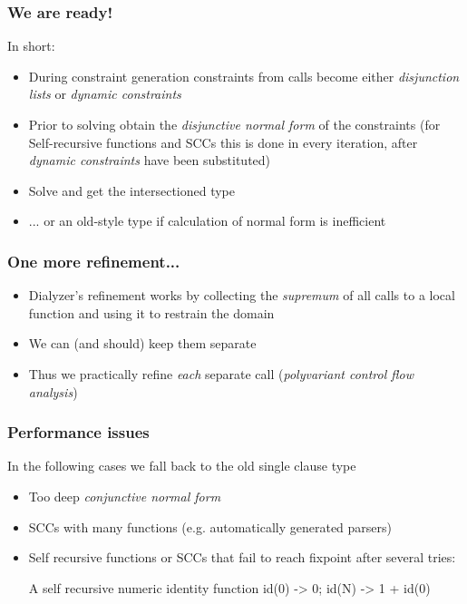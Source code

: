 \documentclass{beamer}
\begin{document}
\begin{frame}
  \frametitle{We are ready!}
  In short: \pause
  \begin{itemize}
  \item During constraint generation constraints from calls become
    either \emph{disjunction lists} or \emph{dynamic constraints} \pause
  \item Prior to solving obtain the \emph{disjunctive normal form} of
    the constraints (for Self-recursive functions and SCCs this is
    done in every iteration, after \emph{dynamic constraints} have
    been substituted) \pause
  \item Solve and get the intersectioned type \pause
  \item ... or an old-style type if calculation of normal form is
    inefficient
  \end{itemize}
\end{frame}

\begin{frame}
  \frametitle{One more refinement...}
  \begin{itemize}
  \item Dialyzer's refinement works by collecting the
    \emph{supremum} of all calls to a local function and
    using it to restrain the domain \pause
  \item We can (and should) keep them separate \pause
  \item Thus we practically refine \emph{each} separate
    call (\emph{polyvariant control flow analysis})
  \end{itemize}
\end{frame}

\begin{frame}[fragile]
  \frametitle{Performance issues}
  In the following cases we fall back to the old single clause type
  \begin{itemize}
    \item Too deep \emph{conjunctive normal form}
    \item SCCs with many functions (e.g. automatically generated
      parsers)
    \item Self recursive functions or SCCs that fail to reach fixpoint
      after several tries:
\begin{code}{A self recursive numeric identity function}
    id(0) -> 0; id(N) -> 1 + id(0)
\end{code}
  \end{itemize}
\end{frame}
\end{document}
